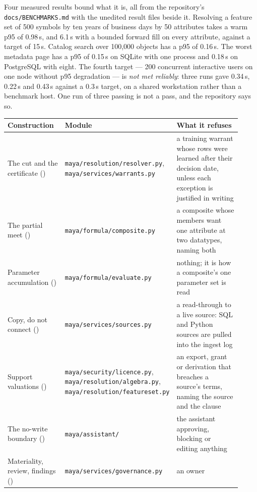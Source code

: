 \documentclass[11pt,a4paper]{article}
\renewcommand{\_}{\oldunderscore\allowbreak}
\theoremstyle{plain}
\theoremstyle{definition}
\theoremstyle{definition}
\theoremstyle{remark}
\begin{document}
Four measured results bound what it is, all from the repository's \texttt{docs/BENCHMARKS.md} with the
unedited result files beside it. Resolving a feature set of 500 symbols by ten years of business days by
50 attributes takes a warm p95 of 0.98\,s, and 6.1\,s with a bounded forward fill on every attribute,
against a target of 15\,s. Catalog search over 100{,}000 objects has a p95 of 0.16\,s. The worst metadata
page has a p95 of 0.15\,s on SQLite with one process and 0.18\,s on PostgreSQL with eight. The fourth
target --- 200 concurrent interactive users on one node without p95 degradation --- is \emph{not met
reliably}: three runs gave 0.34\,s, 0.22\,s and 0.43\,s against a 0.3\,s target, on a shared workstation
rather than a benchmark host. One run of three passing is not a pass, and the repository says so.

\begin{center}
\small
\begin{longtable}{@{}L{0.25\linewidth}L{0.37\linewidth}L{0.30\linewidth}@{}}
\toprule
\textbf{Construction} & \textbf{Module} & \textbf{What it refuses} \\
\midrule
\endhead
The cut and the certificate () & \texttt{maya/resolution/resolver.py},
\texttt{maya/services/warrants.py} & a training warrant whose rows were learned after their decision date,
unless each exception is justified in writing \\
The partial meet () & \texttt{maya/formula/composite.py} & a composite whose members
want one attribute at two datatypes, naming both \\
Parameter accumulation () & \texttt{maya/formula/evaluate.py} & nothing; it is how a
composite's one parameter set is read \\
Copy, do not connect () & \texttt{maya/services/sources.py} & a read-through to a live
source: SQL and Python sources are pulled into the ingest log \\
Support valuations () & \texttt{maya/security/licence.py},
\texttt{maya/resolution/algebra.py}, \texttt{maya/resolution/featureset.py} & an export, grant or
derivation that breaches a source's terms, naming the source and the clause \\
The no-write boundary () & \texttt{maya/assistant/} & the assistant approving,
blocking or editing anything \\
Materiality, review, findings () & \texttt{maya/services/governance.py} & an owner

\end{longtable}
\end{center}
\end{document}
